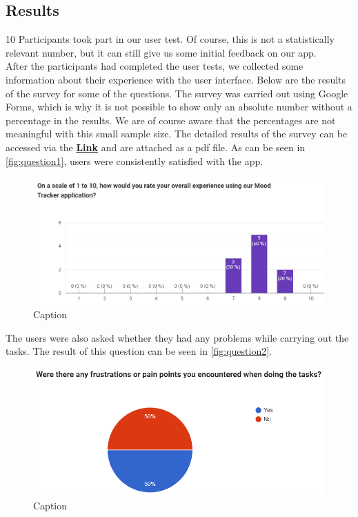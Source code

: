 \documentclass[11pt]{article}
\begin{document}
\subsection{Results}
10 Participants took part in our user test. Of course, this is not a statistically relevant number, but it can still give us some initial feedback on our app. \\
After the participants had completed the user tests, we collected some information about their experience with the user interface. Below are the results of the survey for some of the questions. The survey was carried out using Google Forms, which is why it is not possible to show only an absolute number without a percentage in the results. We are of course aware that the percentages are not meaningful with this small sample size. The detailed results of the survey can be accessed via the \href{https://docs.google.com/forms/d/1XZn5U9J93oJQlkRKYR0nUfQ5ODQfRJeZ9GHHDy1MJC8/viewanalytics}{\textbf{Link}} and are attached as a pdf file. As can be seen in \autoref{fig:question1}, users were consistently satisfied with the app.
\begin{figure}[h!]
    \centering
    \includegraphics[width = \textwidth]{figures/Question 1.PNG}
    \caption{Caption}
    \label{fig:question1}
\end{figure}
\clearpage 
The users were also asked whether they had any problems while carrying out the tasks. The result of this question can be seen in \autoref{fig:question2}. 
\begin{figure}[h!]
    \centering
    \includegraphics[width = \textwidth]{figures/Question 3.PNG}
    \caption{Caption}
    \label{fig:question2}
\end{figure}
\end{document}
